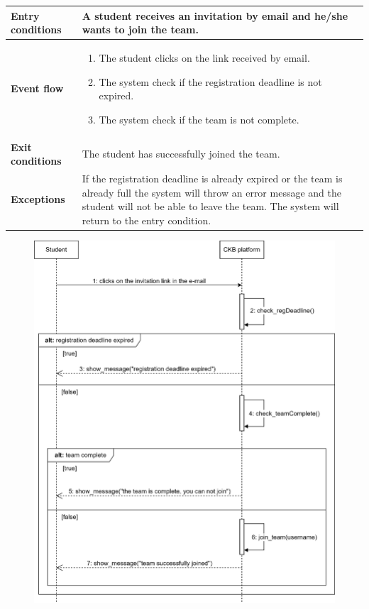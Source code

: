 \begin{enumerate}[label=\textbf{UC.\arabic*}]
\begin{table}[h]
\begin{tabular}{|m{3.2cm}|m{9.8cm}|}
                    \hline
                    \textbf{Entry conditions}  & A student receives an invitation by email and he/she wants to join the team. \\
                    \hline
                    \textbf{Event flow}  & 
                    \begin{enumerate}[label=\arabic*.]
                        \item The student clicks on the link received by email.
                        \item The system check if the registration deadline is not expired.
                        \item The system check if the team is not complete.
                    \end{enumerate}\\ 
                    \hline
                    \textbf{Exit conditions}  & The student has successfully joined the team. \\
                    \hline
                    \textbf{Exceptions}  & If the registration deadline is already expired or the team is already full the system will throw an error message and the student will not be able to leave the team. The system will return to the entry condition. \\
                    \hline 
                \end{tabular}
        \end{table}
        \begin{figure}[h]
            \centering
            \includegraphics[scale = 0.7]{images/sd/acceptsS.png}

\end{figure}
\end{enumerate}
